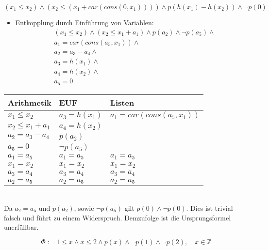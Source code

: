 \documentclass{scrartcl}
\begin{document}
\begin{equation*}
	(x_1 \leq x_2) \wedge (x_2 \leq (x_1 + car(cons(0,x_1)))) \wedge p(h(x_1) - h(x_2)) \wedge \neg p(0)
\end{equation*}

\begin{itemize}
	\item Entkopplung durch Einführung von Variablen:
	\begin{align*}
		& (x_1 \leq x_2) \wedge (x_2 \leq x_1 + a_1) \wedge p(a_2) \wedge \neg p(a_5) \wedge \\
		& a_1 = car(cons(a_5,x_1)) \wedge \\
		& a_2 = a_3 - a_4 \wedge \\
		& a_3 = h(x_1) \wedge \\
		& a_4 = h(x_2) \wedge \\
		& a_5 = 0
	\end{align*}
\end{itemize}

\begin{tabular}{|l|l|l|}
	\hline 
	Arithmetik & EUF & Listen \\ 
	\hline 
	\hline 
	$ x_1 \leq x_2 $ & $ a_3 = h(x_1) $ & $ a_1 = car(cons(a_5,x_1)) $ \\ 
	\hline 
	$ x_2 \leq x_1 + a_1 $ & $ a_4 = h(x_2) $ &  \\ 
	\hline 
	$ a_2 = a_3 - a_4 $ & $ p(a_2) $ &  \\ 
	\hline 
	$ a_5 = 0 $ & $ \neg p(a_5) $ &  \\ 
	\hline 
	\hline 
	$ a_1 = a_5 $ & $ a_1 = a_5 $ & {\cellcolor[gray]{.8}}$ a_1 = a_5 $ \\ 
	\hline 
	{\cellcolor[gray]{.8}}$ x_1 = x_2 $ & $ x_1 = x_2 $ & $ x_1 = x_2 $ \\ 
	\hline 
	$ a_3 = a_4 $ & {\cellcolor[gray]{.8}}$ a_3 = a_4 $ & $ a_3 = a_4 $ \\ 
	\hline 
	{\cellcolor[gray]{.8}}$ a_2 = a_5 $ & $ a_2 = a_5 $ & $ a_2 = a_5 $ \\ 
	\hline 
\end{tabular} \\

Da $ a_2 = a_5 $ und $ p(a_2) $, sowie $ \neg p(a_5) $ gilt $ p(0) \wedge \neg p(0) $. Dies ist trivial falsch und führt zu einem Widerspruch. Demzufolge ist die Ursprungsformel unerfüllbar.

\begin{equation*}
	\Phi := 1 \leq x \wedge x \leq 2 \wedge p(x) \wedge \neg p(1) \wedge \neg p(2), \quad x \in \mathbb{Z}
\end{equation*}
\end{document}
